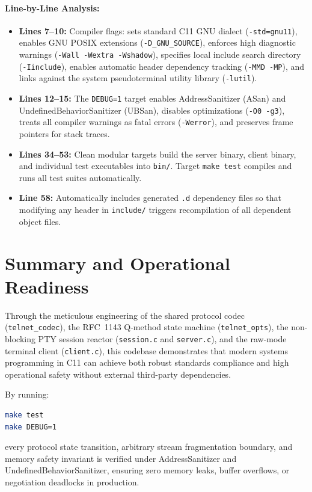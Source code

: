 \paragraph{Line-by-Line Analysis:}
\begin{itemize}[leftmargin=1.5em]
    \item \textbf{Lines 7--10:} Compiler flags: sets standard C11 GNU dialect (\texttt{-std=gnu11}), enables GNU POSIX extensions (\texttt{-D\_GNU\_SOURCE}), enforces high diagnostic warnings (\texttt{-Wall -Wextra -Wshadow}), specifies local include search directory (\texttt{-Iinclude}), enables automatic header dependency tracking (\texttt{-MMD -MP}), and links against the system pseudoterminal utility library (\texttt{-lutil}).
    \item \textbf{Lines 12--15:} The \texttt{DEBUG=1} target enables AddressSanitizer (ASan) and UndefinedBehaviorSanitizer (UBSan), disables optimizations (\texttt{-O0 -g3}), treats all compiler warnings as fatal errors (\texttt{-Werror}), and preserves frame pointers for stack traces.
    \item \textbf{Lines 34--53:} Clean modular targets build the server binary, client binary, and individual test executables into \texttt{bin/}. Target \texttt{make test} compiles and runs all test suites automatically.
    \item \textbf{Line 58:} Automatically includes generated \texttt{.d} dependency files so that modifying any header in \texttt{include/} triggers recompilation of all dependent object files.
\end{itemize}


\section{Summary and Operational Readiness}

Through the meticulous engineering of the shared protocol codec (\texttt{telnet\_codec}), the RFC~1143 Q-method state machine (\texttt{telnet\_opts}), the non-blocking PTY session reactor (\texttt{session.c} and \texttt{server.c}), and the raw-mode terminal client (\texttt{client.c}), this codebase demonstrates that modern systems programming in C11 can achieve both robust standards compliance and high operational safety without external third-party dependencies.

By running:
\begin{lstlisting}[language=bash]
make test
make DEBUG=1
\end{lstlisting}
every protocol state transition, arbitrary stream fragmentation boundary, and memory safety invariant is verified under AddressSanitizer and UndefinedBehaviorSanitizer, ensuring zero memory leaks, buffer overflows, or negotiation deadlocks in production.
